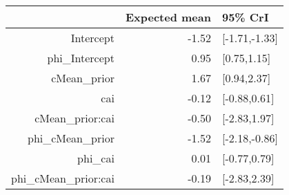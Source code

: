 \begin{tabular}{rrl}
  \hline
 & Expected mean & 95\% CrI \\ 
  \hline
Intercept & -1.52 & [-1.71,-1.33] \\ 
  phi\_Intercept & 0.95 & [0.75,1.15] \\ 
  cMean\_prior & 1.67 & [0.94,2.37] \\ 
  cai & -0.12 & [-0.88,0.61] \\ 
  cMean\_prior:cai & -0.50 & [-2.83,1.97] \\ 
  phi\_cMean\_prior & -1.52 & [-2.18,-0.86] \\ 
  phi\_cai & 0.01 & [-0.77,0.79] \\ 
  phi\_cMean\_prior:cai & -0.19 & [-2.83,2.39] \\ 
   \hline
\end{tabular}

